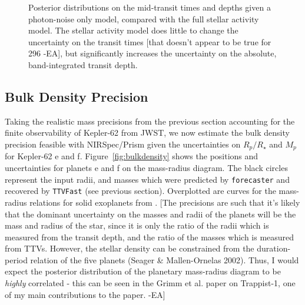 \begin{figure}
\caption{Posterior distributions on the mid-transit times and depths given a photon-noise only model, compared with the full stellar activity model. The stellar activity model does little to change the uncertainty on the transit times [that doesn't appear to be true for 296 -EA], but significantly increases the uncertainty on the absolute, band-integrated transit depth.}
\label{fig:photon_noise}
\end{figure}

\subsection{Bulk Density Precision}

Taking the realistic mass precisions from the previous section accounting for the finite observability of Kepler-62 from JWST, we now estimate the bulk density precision feasible with NIRSpec/Prism given the uncertainties on $R_p/R_\star$ and $M_p$ for Kepler-62 e and f. Figure~\ref{fig:bulkdensity} shows the positions and uncertainties for planets e and f on the mass-radius diagram. The black circles represent the input radii, and masses which were predicted by \texttt{forecaster} and recovered by \texttt{TTVFast} (see previous section). Overplotted are curves for the mass-radius relations for solid exoplanets from \citet{Seager2007}. [The precisions are such that it's likely that the dominant uncertainty on
the masses and radii of the planets will be the mass and radius of the star, since it is only the ratio of the radii which is measured from the transit depth, and the ratio
of the masses which is measured from TTVs.  However, the stellar density can be constrained from the duration-period relation of the five planets (Seager \&  Mallen-Ornelas 2002).  Thus, I would expect the posterior distribution of the planetary mass-radius diagram to be {\it highly} correlated - this can be seen in the Grimm et al. 
paper on Trappist-1, one of my main contributions to the paper.  -EA]


